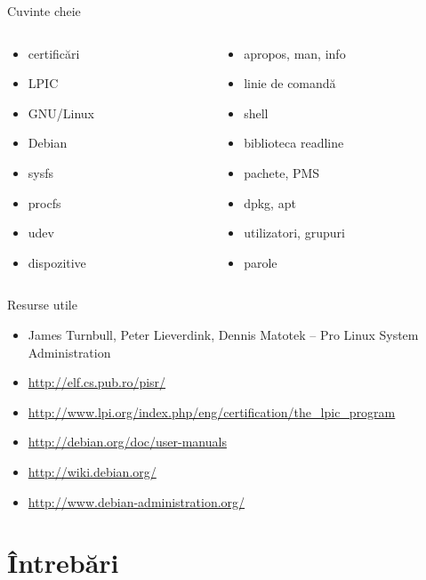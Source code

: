 \documentclass{workshop}
\begin{document}
\begin{frame}{Cuvinte cheie}
  \begin{columns}
    \begin{column}[l]{0.5\textwidth}
      \begin{itemize}
        \item certificări
        \item LPIC
        \item GNU/Linux
        \item Debian
        \item sysfs
        \item procfs
        \item udev
        \item dispozitive
      \end{itemize}
    \end{column}
    \begin{column}[l]{0.5\textwidth}
      \begin{itemize}
        \item apropos, man, info
        \item linie de comandă
        \item shell
        \item biblioteca readline
        \item pachete, PMS
        \item dpkg, apt
        \item utilizatori, grupuri
        \item parole
      \end{itemize}
    \end{column}
  \end{columns}
\end{frame}

\begin{frame}{Resurse utile}
  \begin{itemize}
    \item James Turnbull, Peter Lieverdink, Dennis Matotek -- Pro Linux System
    Administration
    \item \url{http://elf.cs.pub.ro/pisr/}
    \item
    \url{http://www.lpi.org/index.php/eng/certification/the_lpic_program}
    \item \url{http://debian.org/doc/user-manuals}
    \item \url{http://wiki.debian.org/}
    \item \url{http://www.debian-administration.org/}
  \end{itemize}
\end{frame}

\section{Întrebări}
\end{document}
